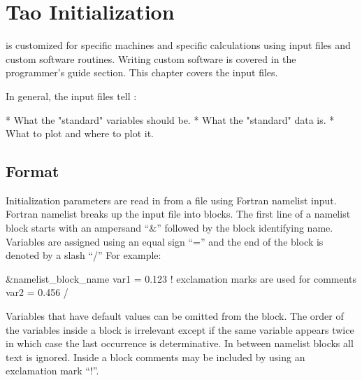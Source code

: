\chapter{Tao Initialization}
\label{c:init}

\tao is customized for specific machines and specific calculations
using input files and custom software routines. Writing custom
software is covered in the programmer's guide section. This chapter
covers the input files.

In general, the input files tell \tao:
\begin{example}
  * What the "standard" variables should be.
  * What the "standard" data is.
  * What to plot and where to plot it.
\end{example}

\section{Format}
\label{s:format}

Initialization parameters are read in from a file using Fortran
namelist input. Fortran namelist breaks up the input file into
blocks. The first line of a namelist block starts with an ampersand
``\&'' followed by the block identifying name. Variables are assigned
using an equal sign ``='' and the end of the block is denoted by a
slash ``/'' For example:
\begin{example}
  &namelist_block_name
    var1 = 0.123   ! exclamation marks are used for comments
    var2 = 0.456
  /
\end{example}
Variables that have default values can be omitted from the block.  The
order of the variables inside a block is irrelevant except if the
same variable appears twice in which case the last occurrence is determinative.
In between namelist blocks all text is ignored. Inside a block comments may be
included by using an exclamation mark ``!''.

